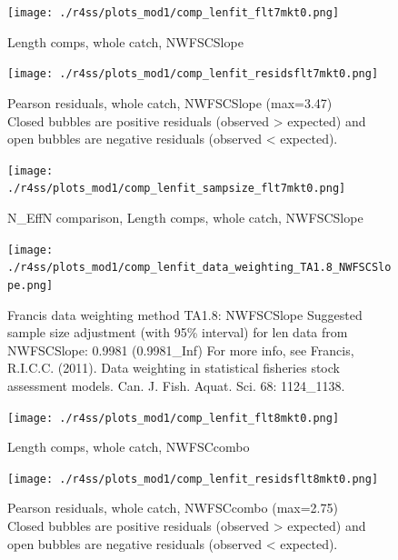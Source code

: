 \documentclass[12pt,]{article}
\begin{document}
\begin{figure}
\centering
\texttt{[image: ./r4ss/plots\_mod1/comp\_lenfit\_flt7mkt0.png]}
\caption{Length comps, whole catch, NWFSCSlope
\label{fig:mod1_26_comp_lenfit_flt7mkt0}}
\end{figure}

\begin{figure}
\centering
\texttt{[image: ./r4ss/plots\_mod1/comp\_lenfit\_residsflt7mkt0.png]}
\caption{Pearson residuals, whole catch, NWFSCSlope (max=3.47)\\
Closed bubbles are positive residuals (observed \textgreater{} expected)
and open bubbles are negative residuals (observed \textless{} expected).
\label{fig:mod1_27_comp_lenfit_residsflt7mkt0}}
\end{figure}

\begin{figure}
\centering
\texttt{[image: ./r4ss/plots\_mod1/comp\_lenfit\_sampsize\_flt7mkt0.png]}
\caption{N\_EffN comparison, Length comps, whole catch, NWFSCSlope
\label{fig:mod1_28_comp_lenfit_sampsize_flt7mkt0}}
\end{figure}

\begin{figure}
\centering
\texttt{[image: ./r4ss/plots\_mod1/comp\_lenfit\_data\_weighting\_TA1.8\_NWFSCSlope.png]}
\caption{Francis data weighting method TA1.8: NWFSCSlope Suggested
sample size adjustment (with 95\% interval) for len data from
NWFSCSlope: 0.9981 (0.9981\_Inf) For more info, see Francis, R.I.C.C.
(2011). Data weighting in statistical fisheries stock assessment models.
Can. J. Fish. Aquat. Sci. 68: 1124\_1138.
\label{fig:mod1_29_comp_lenfit_data_weighting_TA1.8_NWFSCSlope}}
\end{figure}

\begin{figure}
\centering
\texttt{[image: ./r4ss/plots\_mod1/comp\_lenfit\_flt8mkt0.png]}
\caption{Length comps, whole catch, NWFSCcombo
\label{fig:mod1_30_comp_lenfit_flt8mkt0}}
\end{figure}

\begin{figure}
\centering
\texttt{[image: ./r4ss/plots\_mod1/comp\_lenfit\_residsflt8mkt0.png]}
\caption{Pearson residuals, whole catch, NWFSCcombo (max=2.75)\\
Closed bubbles are positive residuals (observed \textgreater{} expected)
and open bubbles are negative residuals (observed \textless{} expected).
\label{fig:mod1_31_comp_lenfit_residsflt8mkt0}}
\end{figure}
\end{document}
